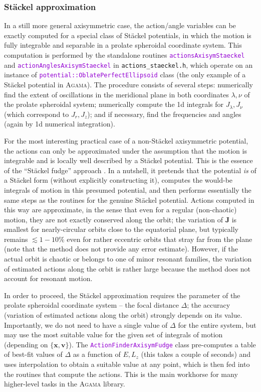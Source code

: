 \documentclass[12pt]{article}
\newcommand{\Agama}{\textsc{Agama}\xspace}
\newcommand{\ttt}[1]{\textcolor{darkviolet}{\texttt{#1}}}
\newcommand{\bv}{\boldsymbol{v}}
\newcommand{\bx}{\boldsymbol{x}}
\newcommand{\bJ}{\boldsymbol{J}}
\begin{document}
\subsubsection{St\"ackel approximation}  \label{sec:ActionsStaeckel}

In a still more general axisymmetric case, the action/angle variables can be exactly computed for a special class of St\"ackel potentials, in which the motion is fully integrable and separable in a prolate spheroidal coordinate system. This computation is performed by the standalone routines \ttt{actionsAxisymStaeckel} and \ttt{actionAnglesAxisymStaeckel} in \mbox{\texttt{actions_staeckel.h}}, which operate on an instance of \ttt{potential::OblatePerfectEllipsoid} class (the only example of a St\"ackel potential in \Agama). The procedure consists of several steps: numerically find the extent of oscillations in the meridional plane in both coordinates $\lambda, \nu$ of the prolate spheroidal system; numerically compute the 1d integrals for $J_\lambda, J_\nu$ (which correspond to $J_r, J_z$); and if necessary, find the frequencies and angles (again by 1d numerical integration).

For the most interesting practical case of a non-St\"ackel axisymmetric potential, the actions can only be approximated under the assumption that the motion is integrable and is locally well described by a St\"ackel potential. This is the essence of the ``St\"ackel fudge'' approach \cite{Binney2012}. In a nutshell, it pretends that the potential \textit{is} of a St\"ackel form (without explicitly constructing it), computes the would-be integrals of motion in this presumed potential, and then performs essentially the same steps as the routines for the genuine St\"ackel potential. Actions computed in this way are approximate, in the sense that even for a regular (non-chaotic) motion, they are not exactly conserved along the orbit; the variation of $\bJ$ is smallest for nearly-circular orbits close to the equatorial plane, but typically remains $\lesssim 1-10\%$ even for rather eccentric orbits that stray far from the plane (note that the method does not provide any error estimate). However, if the actual orbit is chaotic or belongs to one of minor resonant families, the variation of estimated actions along the orbit is rather large because the method does not account for resonant motion.

In order to proceed, the St\"ackel approximation requires the parameter of the prolate spheroidal coordinate system -- the focal distance $\Delta$; the accuracy (variation of estimated actions along the orbit) strongly depends on its value. Importantly, we do not need to have a single value of $\Delta$ for the entire system, but may use the most suitable value for the given set of integrals of motion (depending on $\{\bx,\bv\}$).
The \ttt{ActionFinderAxisymFudge} class pre-computes a table of best-fit values of $\Delta$ as a function of $E,L_z$ (this takes a couple of seconds) and uses interpolation to obtain a suitable value at any point, which is then fed into the routines that compute the actions.
This is the main workhorse for many higher-level tasks in the \Agama library.
\end{document}
